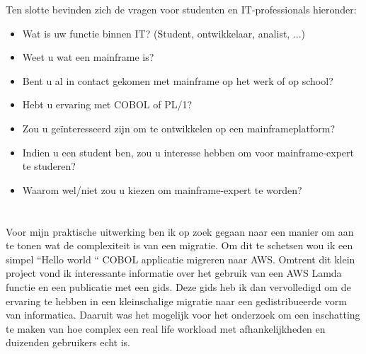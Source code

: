 Ten slotte bevinden zich de vragen voor studenten en IT-professionals hieronder:
 \begin{itemize}
    \item Wat is uw functie binnen IT? (Student, ontwikkelaar, analist, ...)
    \item Weet u wat een mainframe is?
    \item Bent u al in contact gekomen met mainframe op het werk of op school?
    \item Hebt u ervaring met COBOL of PL/1?
    \item Zou u geïnteresseerd zijn om te ontwikkelen op een mainframeplatform?
    \item Indien u een student ben, zou u interesse hebben om voor mainframe-expert te studeren?
    \item Waarom wel/niet zou u kiezen om mainframe-expert te worden?
\end{itemize}



\section{}
\label{sec:De praktische uitwerking}

Voor mijn praktische uitwerking ben ik op zoek gegaan naar een manier om aan te tonen wat de complexiteit is van een migratie. Om dit te schetsen wou ik een simpel ``Hello world `` COBOL applicatie migreren naar AWS. Omtrent dit klein project vond ik interessante informatie over het gebruik van een AWS Lamda functie en een publicatie met een gids. Deze gids heb ik dan vervolledigd om de ervaring te hebben in een kleinschalige migratie naar een gedistribueerde vorm van informatica. Daaruit was het mogelijk voor het onderzoek om een inschatting te maken van hoe complex een real life workload met afhankelijkheden en duizenden gebruikers echt is.
